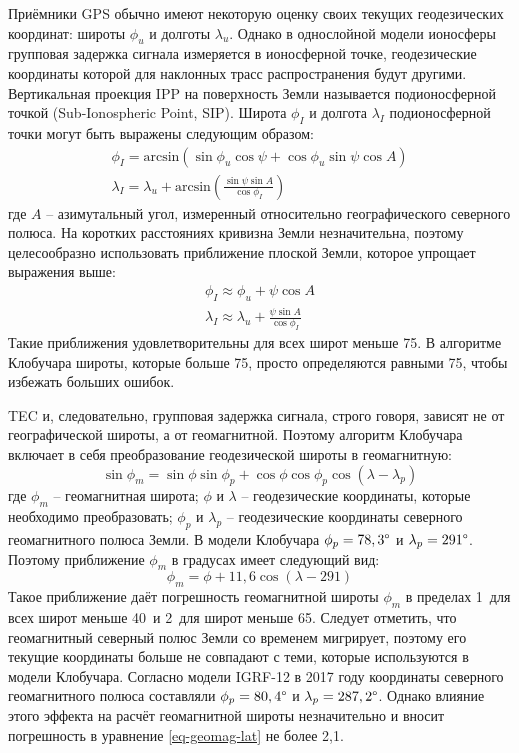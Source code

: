 Приёмники GPS обычно имеют некоторую оценку своих текущих геодезических координат: широты $\phi_u$ и долготы $\lambda_u$.
Однако в однослойной модели ионосферы групповая задержка сигнала измеряется в ионосферной точке, геодезические координаты которой для наклонных трасс распространения будут другими.
Вертикальная проекция IPP на поверхность Земли называется подионосферной точкой (Sub-Ionospheric Point, SIP).
Широта $\phi_I$ и долгота $\lambda_I$ подионосферной точки могут быть выражены следующим образом:
\begin{equation}
\begin{gathered}
\phi_I=\text{arcsin}(\sin \phi_u\cos \psi+\cos\phi_u\sin\psi\cos A) \\
\lambda_I=\lambda_u+\text{arcsin}\left(\frac{\sin\psi\sin A}{\cos\phi_I}\right)
\end{gathered}    
\end{equation}
где
$A$ -- азимутальный угол, измеренный относительно географического северного полюса.
На коротких расстояниях кривизна Земли незначительна, поэтому целесообразно использовать приближение плоской Земли, которое упрощает выражения выше:
\begin{equation}
\begin{gathered}
\phi_I\approx\phi_u+\psi\cos A \\
\lambda_I\approx\lambda_u+\frac{\psi\sin A}{\cos\phi_I}
\end{gathered}  
\label{eq-lat-lon-sip}  
\end{equation}
Такие приближения удовлетворительны для всех широт меньше 75\degree.
В алгоритме Клобучара широты, которые больше 75\degree, просто определяются равными 75\degree, чтобы избежать больших ошибок.

TEC и, следовательно, групповая задержка сигнала, строго говоря, зависят не от географической широты, а от геомагнитной.
Поэтому алгоритм Клобучара включает в себя преобразование геодезической широты в геомагнитную:
\begin{equation}
\sin\phi_m=\sin\phi\sin\phi_p+\cos\phi\cos\phi_p\cos(\lambda-\lambda_p)
\end{equation}
где
$\phi_m$ -- геомагнитная широта;
$\phi$ и $\lambda$ -- геодезические координаты, которые необходимо преобразовать;
$\phi_p$ и $\lambda_p$ -- геодезические координаты северного геомагнитного полюса Земли.
В модели Клобучара $\phi_p=78,3\degree$ и $\lambda_p=291\degree$.
Поэтому приближение $\phi_m$ в градусах имеет следующий вид:
\begin{equation}
\phi_m=\phi+11,6\cos(\lambda-291)
\label{eq-geomag-lat}
\end{equation}
Такое приближение даёт погрешность геомагнитной широты $\phi_m$ в пределах 1\degree~для всех широт меньше 40\degree~и 2\degree~для широт меньше 65\degree. 
Следует отметить, что геомагнитный северный полюс Земли со временем мигрирует, поэтому его текущие координаты больше не совпадают с теми, которые используются в модели Клобучара. 
Согласно модели IGRF-12 \cite{Thebault2015} в 2017 году координаты северного геомагнитного полюса составляли $\phi_p=80,4\degree$ и $\lambda_p=287,2\degree$.
Однако влияние этого эффекта на расчёт геомагнитной широты незначительно и вносит погрешность в уравнение \eqref{eq-geomag-lat} не более 2,1\degree.

